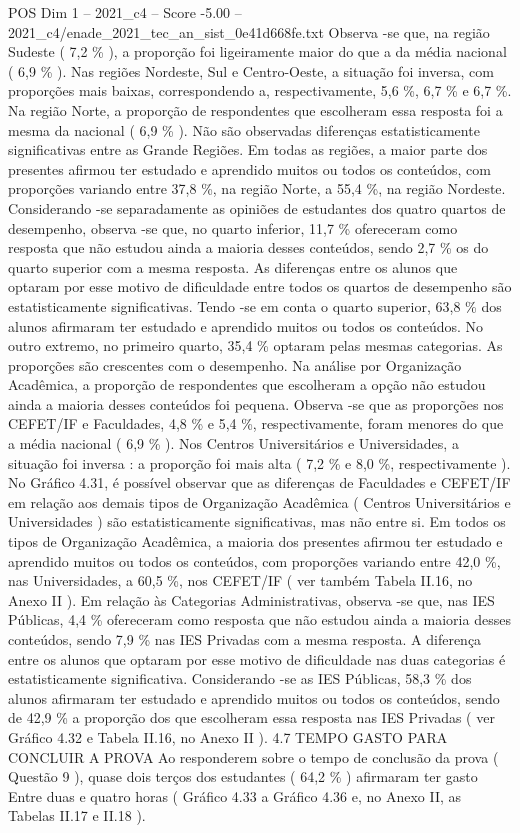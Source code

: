 \begin{textsample}{POS Dim 1 – 2021\_c4 – Score -5.00 – 2021\_c4/enade\_2021\_tec\_an\_sist\_0e41d668fe.txt}
Observa -se que, na região Sudeste ( 7,2 \% ), a proporção foi ligeiramente maior do que a da média nacional ( 6,9 \% ).
Nas regiões Nordeste, Sul e Centro-Oeste, a situação foi inversa, com proporções mais baixas, correspondendo a, respectivamente, 5,6 \%, 6,7 \% e 6,7 \%.
Na região Norte, a proporção de respondentes que escolheram essa resposta foi a mesma da nacional ( 6,9 \% ).
Não são observadas diferenças estatisticamente significativas entre as Grande Regiões.
Em todas as regiões, a maior parte dos presentes afirmou ter estudado e aprendido muitos ou todos os conteúdos, com proporções variando entre 37,8 \%, na região Norte, a 55,4 \%, na região Nordeste.
Considerando -se separadamente as opiniões de estudantes dos quatro quartos de desempenho, observa -se que, no quarto inferior, 11,7 \% ofereceram como resposta que não estudou ainda a maioria desses conteúdos, sendo 2,7 \% os do quarto superior com a mesma resposta.
As diferenças entre os alunos que optaram por esse motivo de dificuldade entre todos os quartos de desempenho são estatisticamente significativas.
Tendo -se em conta o quarto superior, 63,8 \% dos alunos afirmaram ter estudado e aprendido muitos ou todos os conteúdos.
No outro extremo, no primeiro quarto, 35,4 \% optaram pelas mesmas categorias.
As proporções são crescentes com o desempenho.
Na análise por Organização Acadêmica, a proporção de respondentes que escolheram a opção não estudou ainda a maioria desses conteúdos foi pequena.
Observa -se que as proporções nos CEFET/IF e Faculdades, 4,8 \% e 5,4 \%, respectivamente, foram menores do que a média nacional ( 6,9 \% ).
Nos Centros Universitários e Universidades, a situação foi inversa : a proporção foi mais alta ( 7,2 \% e 8,0 \%, respectivamente ).
No Gráfico 4.31, é possível observar que as diferenças de Faculdades e CEFET/IF em relação aos demais tipos de Organização Acadêmica ( Centros Universitários e Universidades ) são estatisticamente significativas, mas não entre si.
Em todos os tipos de Organização Acadêmica, a maioria dos presentes afirmou ter estudado e aprendido muitos ou todos os conteúdos, com proporções variando entre 42,0 \%, nas Universidades, a 60,5 \%, nos CEFET/IF ( ver também Tabela II.16, no Anexo II ).
Em relação às Categorias Administrativas, observa -se que, nas IES Públicas, 4,4 \% ofereceram como resposta que não estudou ainda a maioria desses conteúdos, sendo 7,9 \% nas IES Privadas com a mesma resposta.
A diferença entre os alunos que optaram por esse motivo de dificuldade nas duas categorias é estatisticamente significativa.
Considerando -se as IES Públicas, 58,3 \% dos alunos afirmaram ter estudado e aprendido muitos ou todos os conteúdos, sendo de 42,9 \% a proporção dos que escolheram essa resposta nas IES Privadas ( ver Gráfico 4.32 e Tabela II.16, no Anexo II ). 4.7 TEMPO GASTO PARA CONCLUIR A PROVA Ao responderem sobre o tempo de conclusão da prova ( Questão 9 ), quase dois terços dos estudantes ( 64,2 \% ) afirmaram ter gasto Entre duas e quatro horas ( Gráfico 4.33 a Gráfico 4.36 e, no Anexo II, as Tabelas II.17 e II.18 ).

\end{textsample}

